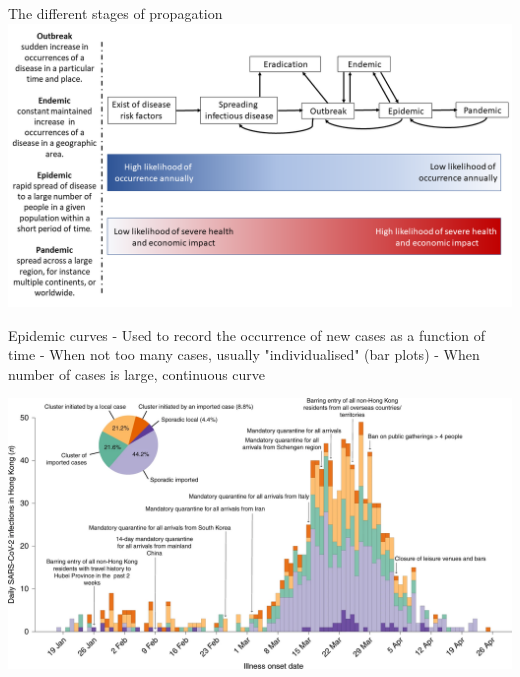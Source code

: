 \documentclass[aspectratio=169]{beamer}\usepackage[]{graphicx}\usepackage[]{xcolor}
\begin{document}
\begin{frame}{The different stages of propagation}
        \includegraphics[width=\textwidth]{FIGS/Difference_between_outbreak,_endemic,_epidemic_and_pandemic-en.png}
\end{frame}
        


\begin{frame}{Epidemic curves}
- Used to record the occurrence of new cases as a function of time
\vfill
- When not too many cases, usually "individualised" (bar plots)
\vfill
- When number of cases is large, continuous curve
\end{frame}


\begin{frame}
    \includegraphics[width=\textwidth]{FIGS/41591_2020_1092_Fig1_HTML.png}
\end{frame}
\end{document}
